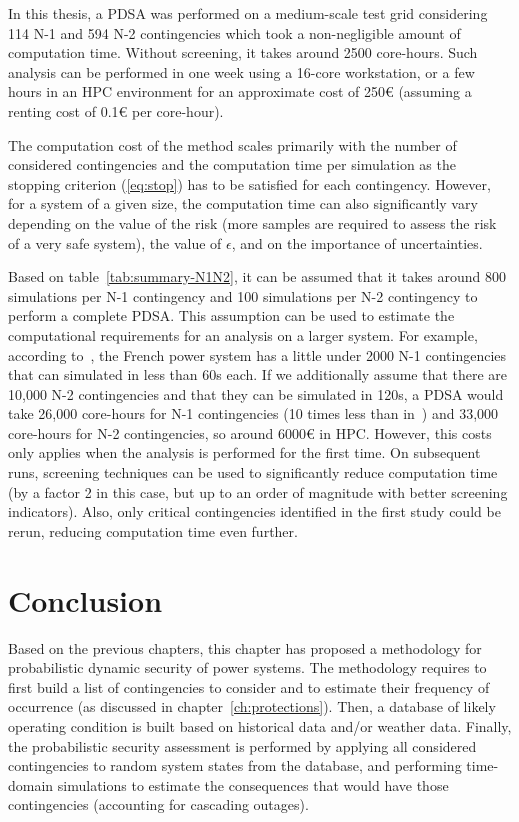 In this thesis, a PDSA was performed on a medium-scale test grid considering 114 N-1 and 594 N-2 contingencies which took a non-negligible amount of computation time. Without screening, it takes around 2500 core-hours. Such analysis can be performed in one week using a 16-core workstation, or a few hours in an HPC environment for an approximate cost of 250€ (assuming a renting cost of 0.1€ per core-hour).

The computation cost of the method scales primarily with the number of considered contingencies and the computation time per simulation as the stopping criterion (\ref{eq:stop}) has to be satisfied for each contingency. However, for a system of a given size, the computation time can also significantly vary depending on the value of the risk (more samples are required to assess the risk of a very safe system), the value of \(\epsilon\), and on the importance of uncertainties.

Based on table~\ref{tab:summary-N1N2}, it can be assumed that it takes around 800 simulations per N-1 contingency and 100 simulations per N-2 contingency to perform a complete PDSA. This assumption can be used to estimate the computational requirements for an analysis on a larger system. For example, according to~\cite{EurostagHPC}, the French power system has a little under 2000 N-1 contingencies that can simulated in less than 60s each. If we additionally assume that there are 10,000 N-2 contingencies and that they can be simulated in 120s, a PDSA would take 26,000 core-hours for N-1 contingencies (10 times less than in~\cite{EurostagHPC}) and 33,000 core-hours for N-2 contingencies, so around 6000€ in HPC. However, this costs only applies when the analysis is performed for the first time. On subsequent runs, screening techniques can be used to significantly reduce computation time (by a factor 2 in this case, but up to an order of magnitude with better screening indicators). Also, only critical contingencies identified in the first study could be rerun, reducing computation time even further.

\section{Conclusion}
\label{sec:PDSA_conclusion}

Based on the previous chapters, this chapter has proposed a methodology for probabilistic dynamic security of power systems. The methodology requires to first build a list of contingencies to consider and to estimate their frequency of occurrence (as discussed in chapter~\ref{ch:protections}). Then, a database of likely operating condition is built based on historical data and/or weather data. Finally, the probabilistic security assessment is performed by applying all considered contingencies to random system states from the database, and performing time-domain simulations to estimate the consequences that would have those contingencies (accounting for cascading outages).

